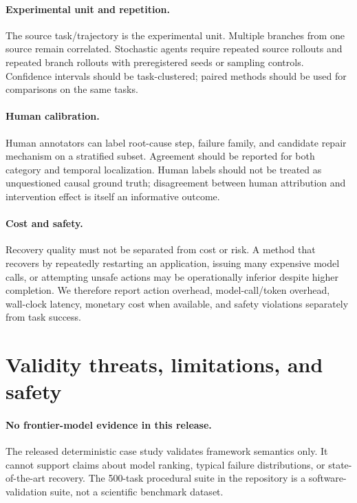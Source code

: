 \documentclass{article}
\begin{document}
\paragraph{Experimental unit and repetition.}
The source task/trajectory is the experimental unit. Multiple branches from one source remain correlated. Stochastic agents require repeated source rollouts and repeated branch rollouts with preregistered seeds or sampling controls. Confidence intervals should be task-clustered; paired methods should be used for comparisons on the same tasks.

\paragraph{Human calibration.}
Human annotators can label root-cause step, failure family, and candidate repair mechanism on a stratified subset. Agreement should be reported for both category and temporal localization. Human labels should not be treated as unquestioned causal ground truth; disagreement between human attribution and intervention effect is itself an informative outcome.

\paragraph{Cost and safety.}
Recovery quality must not be separated from cost or risk. A method that recovers by repeatedly restarting an application, issuing many expensive model calls, or attempting unsafe actions may be operationally inferior despite higher completion. We therefore report action overhead, model-call/token overhead, wall-clock latency, monetary cost when available, and safety violations separately from task success.

\section{Validity threats, limitations, and safety}

\paragraph{No frontier-model evidence in this release.}
The released deterministic case study validates framework semantics only. It cannot support claims about model ranking, typical failure distributions, or state-of-the-art recovery. The 500-task procedural suite in the repository is a software-validation suite, not a scientific benchmark dataset.
\end{document}
